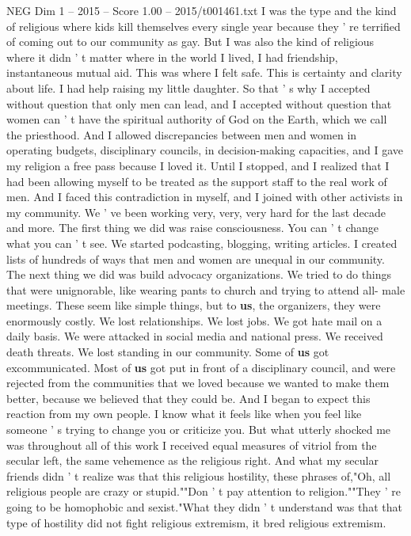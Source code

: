 \begin{textsample}{NEG Dim 1 – 2015 – Score 1.00 – 2015/t001461.txt}
I was the type and the kind of religious where kids kill themselves every single year because they ' re terrified of coming out to our community as gay.
But I was also the kind of religious where it didn ' t matter where in the world I lived, I had friendship, instantaneous mutual aid.
This was where I felt safe.
This is certainty and clarity about life.
I had help raising my little daughter.
So that ' s why I accepted without question that only men can lead, and I accepted without question that women can ' t have the spiritual authority of God on the Earth, which we call the priesthood.
And I allowed discrepancies between men and women in operating budgets, disciplinary councils, in decision-making capacities, and I gave my religion a free pass because I loved it.
Until I stopped, and I realized that I had been allowing myself to be treated as the support staff to the real work of men.
And I faced this contradiction in myself, and I joined with other activists in my community.
We ' ve been working very, very, very hard for the last decade and more.
The first thing we did was raise consciousness.
You can ' t change what you can ' t see.
We started podcasting, blogging, writing articles.
I created lists of hundreds of ways that men and women are unequal in our community.
The next thing we did was build advocacy organizations.
We tried to do things that were unignorable, like wearing pants to church and trying to attend all- male meetings.
These seem like simple things, but to \textbf{us}, the organizers, they were enormously costly.
We lost relationships.
We lost jobs.
We got hate mail on a daily basis.
We were attacked in social media and national press.
We received death threats.
We lost standing in our community.
Some of \textbf{us} got excommunicated.
Most of \textbf{us} got put in front of a disciplinary council, and were rejected from the communities that we loved because we wanted to make them better, because we believed that they could be.
And I began to expect this reaction from my own people.
I know what it feels like when you feel like someone ' s trying to change you or criticize you.
But what utterly shocked me was throughout all of this work I received equal measures of vitriol from the secular left, the same vehemence as the religious right.
And what my secular friends didn ' t realize was that this religious hostility, these phrases of,"Oh, all religious people are crazy or stupid.""Don ' t pay attention to religion.""They ' re going to be homophobic and sexist."What they didn ' t understand was that that type of hostility did not fight religious extremism, it bred religious extremism.

\end{textsample}
